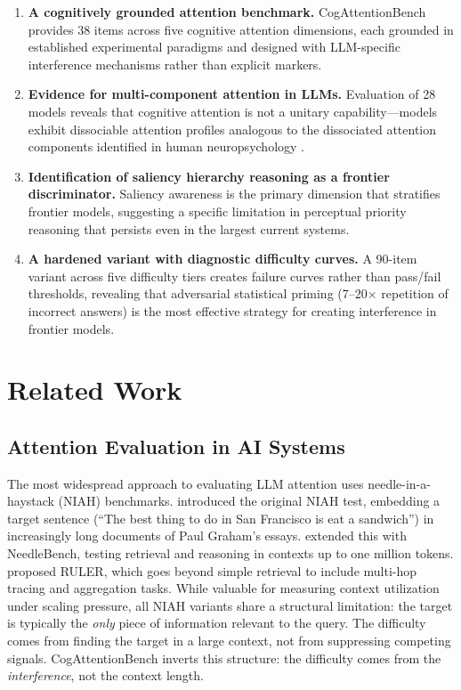 \documentclass{article}
\begin{document}
\begin{enumerate}
    \item \textbf{A cognitively grounded attention benchmark.} CogAttentionBench provides 38 items across five cognitive attention dimensions, each grounded in established experimental paradigms \citep{stroop1935,eriksen1974,rogers1995,rosvold1956,simons1999,treisman1980} and designed with LLM-specific interference mechanisms rather than explicit markers.
    \item \textbf{Evidence for multi-component attention in LLMs.} Evaluation of 28 models reveals that cognitive attention is not a unitary capability---models exhibit dissociable attention profiles analogous to the dissociated attention components identified in human neuropsychology \citep{posner1990}.
    \item \textbf{Identification of saliency hierarchy reasoning as a frontier discriminator.} Saliency awareness is the primary dimension that stratifies frontier models, suggesting a specific limitation in perceptual priority reasoning that persists even in the largest current systems.
    \item \textbf{A hardened variant with diagnostic difficulty curves.} A 90-item variant across five difficulty tiers creates failure curves rather than pass/fail thresholds, revealing that adversarial statistical priming (7--20$\times$ repetition of incorrect answers) is the most effective strategy for creating interference in frontier models.
\end{enumerate}

\section{Related Work}

\subsection{Attention Evaluation in AI Systems}

The most widespread approach to evaluating LLM attention uses needle-in-a-haystack (NIAH) benchmarks. \citet{kamradt2023} introduced the original NIAH test, embedding a target sentence (``The best thing to do in San Francisco is eat a sandwich'') in increasingly long documents of Paul Graham's essays. \citet{li2024} extended this with NeedleBench, testing retrieval and reasoning in contexts up to one million tokens. \citet{hsieh2024} proposed RULER, which goes beyond simple retrieval to include multi-hop tracing and aggregation tasks. While valuable for measuring context utilization under scaling pressure, all NIAH variants share a structural limitation: the target is typically the \emph{only} piece of information relevant to the query. The difficulty comes from finding the target in a large context, not from suppressing competing signals. CogAttentionBench inverts this structure: the difficulty comes from the \emph{interference}, not the context length.
\end{document}
